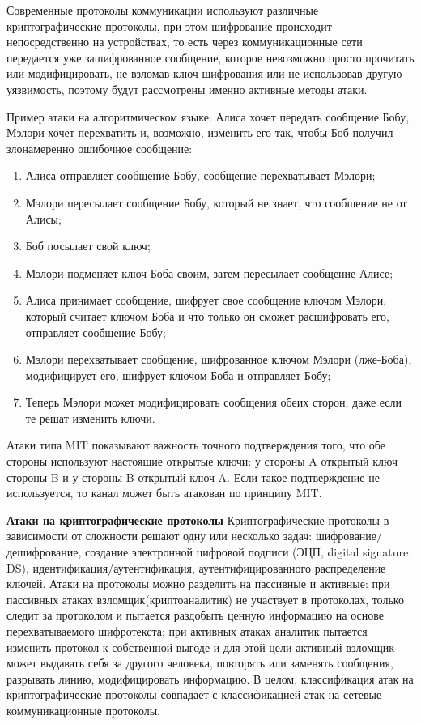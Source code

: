 	Современные протоколы коммуникации используют различные криптографические протоколы, при этом шифрование происходит непосредственно на устройствах, то есть через коммуникационные сети передается уже зашифрованное сообщение, которое невозможно просто прочитать или модифицировать, не взломав ключ шифрования или не использовав другую уязвимость, поэтому будут рассмотрены именно активные методы атаки. 
	
	Пример атаки на алгоритмическом языке: Алиса хочет передать сообщение Бобу, Мэлори хочет перехватить и, возможно, изменить его так, чтобы Боб получил  злонамеренно ошибочное сообщение:
	\begin{enumerate}
		\item Алиса отправляет сообщение Бобу,  сообщение перехватывает Мэлори;
		\item Мэлори пересылает сообщение Бобу, который не знает, что сообщение не от Алисы;
		\item Боб посылает свой ключ;
		\item Мэлори подменяет ключ Боба своим, затем  пересылает сообщение Алисе;
		\item Алиса принимает сообщение, шифрует свое сообщение ключом Мэлори, который считает ключом Боба и  что только он сможет расшифровать его, отправляет сообщение Бобу;
		\item Мэлори перехватывает сообщение, шифрованное ключом Мэлори (лже-Боба), модифицирует его, шифрует ключом Боба и отправляет Бобу;
		\item Теперь Мэлори может модифицировать сообщения  обеих сторон, даже если те решат изменить ключи.
	\end{enumerate}
	Атаки типа MIT показывают важность точного подтверждения того, что обе стороны используют настоящие открытые ключи: у стороны A открытый ключ стороны B и у стороны B открытый ключ A. Если такое подтверждение не используется, то канал может быть атакован по принципу MIT. 
	
	\textbf{Атаки на криптографические протоколы}
	Криптографические протоколы в зависимости от сложности  решают одну или несколько   задач: шифрование/дешифрование, создание электронной цифровой подписи (ЭЦП, digital signature, DS), идентификация/аутентификация, аутентифицированного распределение ключей. Атаки на протоколы можно разделить на пассивные и активные: при пассивных атаках взломщик(криптоаналитик) не участвует в протоколах, только следит за протоколом и пытается раздобыть ценную информацию на основе перехватываемого шифротекста; при активных атаках   аналитик пытается изменить протокол к собственной выгоде и для этой цели активный взломщик может выдавать себя за другого человека, повторять или 	 заменять сообщения, разрывать линию, модифицировать информацию. В  целом, классификация атак на криптографические протоколы совпадает с классификацией атак на сетевые коммуникационные протоколы.
	
